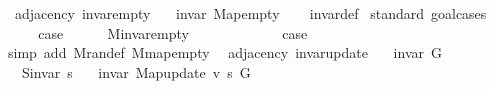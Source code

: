 \begin{isabellebody}
\endisatagproof
{\isafoldproof}%
%
\isadelimproof
\isanewline
%
\endisadelimproof
%
\isadeliminvisible
\isanewline
%
\endisadeliminvisible
%
\isataginvisible
{}\isamarkupfalse%
\ {\isacharparenleft}{\kern0pt}\ adjacency{\isacharparenright}{\kern0pt}\ invar{\isacharunderscore}{\kern0pt}empty{\isacharcolon}{\kern0pt}\isanewline
\ \ \ {\isachardoublequoteopen}invar\ Map{\isacharunderscore}{\kern0pt}empty{\isachardoublequoteclose}%
\endisataginvisible
{\isafoldinvisible}%
%
\isadeliminvisible
\isanewline
%
\endisadeliminvisible
%
\isadelimproof
\ \ %
\endisadelimproof
%
\isatagproof
{}\isamarkupfalse%
\ invar{\isacharunderscore}{\kern0pt}def\isanewline
{}\isamarkupfalse%
\ {\isacharparenleft}{\kern0pt}standard{\isacharcomma}{\kern0pt}\ goal{\isacharunderscore}{\kern0pt}cases{\isacharparenright}{\kern0pt}\isanewline
\ \ \isamarkupfalse%
\ {}\isanewline
\ \ \isamarkupfalse%
\ {\isacharquery}{\kern0pt}case\isanewline
\ \ \ \ \isamarkupfalse%
\ M{\isachardot}{\kern0pt}invar{\isacharunderscore}{\kern0pt}empty\isanewline
\ \ \ \ \isacommand{{\isachardot}{\kern0pt}}\isamarkupfalse%
\isanewline
{}\isamarkupfalse%
\isanewline
\ \ \isamarkupfalse%
\ {}\isanewline
\ \ \isamarkupfalse%
\ {\isacharquery}{\kern0pt}case\isanewline
\ \ \ \ \isamarkupfalse%
\ {\isacharparenleft}{\kern0pt}simp\ add{\isacharcolon}{\kern0pt}\ M{\isachardot}{\kern0pt}ran{\isacharunderscore}{\kern0pt}def\ M{\isachardot}{\kern0pt}map{\isacharunderscore}{\kern0pt}empty{\isacharparenright}{\kern0pt}\isanewline
{}\isamarkupfalse%
%
\endisatagproof
{\isafoldproof}%
%
\isadelimproof
\isanewline
%
\endisadelimproof
%
\isadeliminvisible
\isanewline
%
\endisadeliminvisible
%
\isataginvisible
{}\isamarkupfalse%
\ {\isacharparenleft}{\kern0pt}\ adjacency{\isacharparenright}{\kern0pt}\ invar{\isacharunderscore}{\kern0pt}update{\isacharcolon}{\kern0pt}\isanewline
\ \ \ {\isachardoublequoteopen}invar\ G{\isachardoublequoteclose}\isanewline
\ \ \ {\isachardoublequoteopen}S{\isachardot}{\kern0pt}invar\ s{\isachardoublequoteclose}\isanewline
\ \ \ {\isachardoublequoteopen}invar\ {\isacharparenleft}{\kern0pt}Map{\isacharunderscore}{\kern0pt}update\ v\ s\ G{\isacharparenright}{\kern0pt}{\isachardoublequoteclose}%
\endisataginvisible
{\isafoldinvisible}%
%
\isadeliminvisible
\isanewline
%
\endisadeliminvisible

\end{isabellebody}
